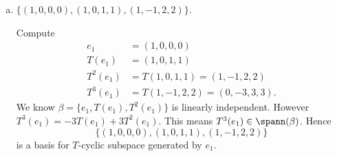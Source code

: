 \begin{Exercise}
	\begin{enumerate}[(a)]
		\item
		\begin{answer}
			$\{(1,0,0,0),(1,0,1,1),(1,-1,2,2)\}$.
		\end{answer}
		\begin{solution}
			Compute
			\begin{align*}
			e_1 &= (1,0,0,0) \\
			T(e_1) &= (1,0,1,1) \\
			T^2(e_1) &= T(1,0,1,1) = (1,-1,2,2) \\
			T^3(e_1) &= T(1,-1,2,2) = (0,-3,3,3).
			\end{align*}
			We know $\beta = \{e_1, T(e_1), T^2(e_1)\}$ is linearly independent. However $T^3(e_1) = -3T(e_1)+3T^2(e_1)$. This means $T^3(e_1)\in \spann(\beta)$. Hence
			$$
			\{(1,0,0,0),(1,0,1,1),(1,-1,2,2)\}
			$$
			is a basis for $T$-cyclic subspace generated by $e_1$.
		\end{solution}
	\end{enumerate}
\end{Exercise}